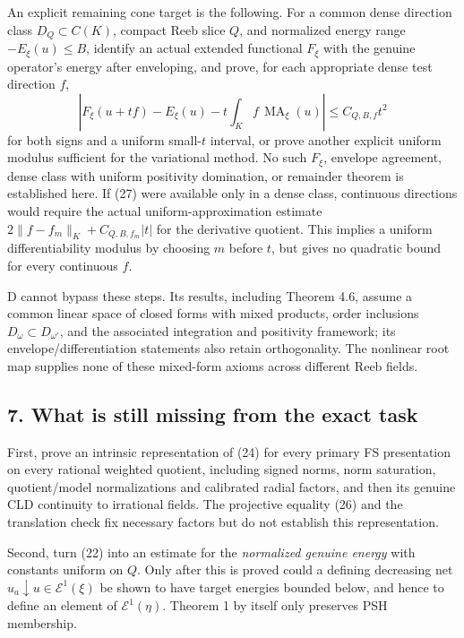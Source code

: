 \documentclass[
  11pt,
]{article}
\begin{document}
An explicit remaining cone target is the following. For a common dense
direction class \(D_Q\subset C(K)\), compact Reeb slice \(Q\), and
normalized energy range \(-E_\xi(u)\leq B\), identify an actual extended
functional \(F_\xi\) with the genuine operator's energy after
enveloping, and prove, for each appropriate dense test direction \(f\),
\[
 |F_\xi(u+tf)-E_\xi(u)-t\int_K f\,\operatorname{MA}_\xi(u)|
 \leq C_{Q,B,f}t^2                                  \tag{27}
\] for both signs and a uniform small-\(t\) interval, or prove another
explicit uniform modulus sufficient for the variational method. No such
\(F_\xi\), envelope agreement, dense class with uniform positivity
domination, or remainder theorem is established here. If (27) were
available only in a dense class, continuous directions would require the
actual uniform-approximation estimate \(2\|f-f_m\|_K+ C_{Q,B,f_m}|t|\)
for the derivative quotient. This implies a uniform differentiability
modulus by choosing \(m\) before \(t\), but gives no quadratic bound for
every continuous \(f\).

D cannot bypass these steps. Its results, including Theorem 4.6, assume
a common linear space of closed forms with mixed products, order
inclusions \(D_\omega\subset D_{\omega'}\), and the associated
integration and positivity framework; its envelope/differentiation
statements also retain orthogonality. The nonlinear root map supplies
none of these mixed-form axioms across different Reeb fields.

\subsection{7. What is still missing from the exact
task}\label{what-is-still-missing-from-the-exact-task}

First, prove an intrinsic representation of (24) for every primary FS
presentation on every rational weighted quotient, including signed
norms, norm saturation, quotient/model normalizations and calibrated
radial factors, and then its genuine CLD continuity to irrational
fields. The projective equality (26) and the translation check fix
necessary factors but do not establish this representation.

Second, turn (22) into an estimate for the \emph{normalized genuine
energy} with constants uniform on \(Q\). Only after this is proved could
a defining decreasing net \(u_a\downarrow u\in\mathcal E^1(\xi)\) be
shown to have target energies bounded below, and hence to define an
element of \(\mathcal E^1(\eta)\). Theorem 1 by itself only preserves
PSH membership.
\end{document}
